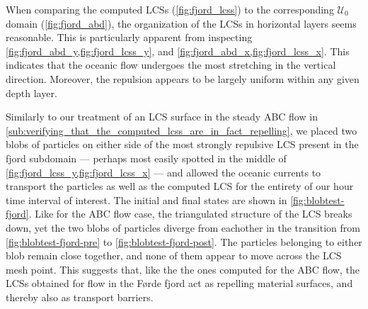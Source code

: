 



When comparing the computed LCSs (\cref{fig:fjord_lcss}) to the corresponding
$\mathcal{U}_{0}$ domain (\cref{fig:fjord_abd}), the organization of
the LCSs in horizontal layers seems reasonable. This is particularly apparent
from inspecting \cref{fig:fjord_abd_y,fig:fjord_lcss_y}, and
\cref{fig:fjord_abd_x,fig:fjord_lcss_x}. This indicates that the oceanic
flow undergoes the most stretching in the vertical direction. Moreover, the
repulsion appears to be largely uniform within any given depth layer.

Similarly to our treatment of an LCS surface in the steady ABC flow in
\cref{sub:verifying_that_the_computed_lcss_are_in_fact_repelling}, we placed
two blobs of particles on either side of the most strongly repulsive LCS
present in the fjord subdomain --- perhaps most easily spotted in the middle
of \cref{fig:fjord_lcss_y,fig:fjord_lcss_x} --- and allowed the oceanic
currents to transport the particles as well as the computed LCS for the
entirety of our  hour time interval of interest. The initial and
final states are shown in \cref{fig:blobtest-fjord}. Like for the ABC flow
case, the triangulated structure of the LCS breaks down, yet the two blobs of
particles diverge from eachother in the transition from
\cref{fig:blobtest-fjord-pre} to \cref{fig:blobtest-fjord-post}. The particles
belonging to either blob remain close together, and none of them appear to
move across the LCS mesh point. This suggests that, like the the ones computed
for the ABC flow, the LCSs obtained for flow in the Førde fjord act as
repelling material surfaces, and thereby also as transport barriers.




